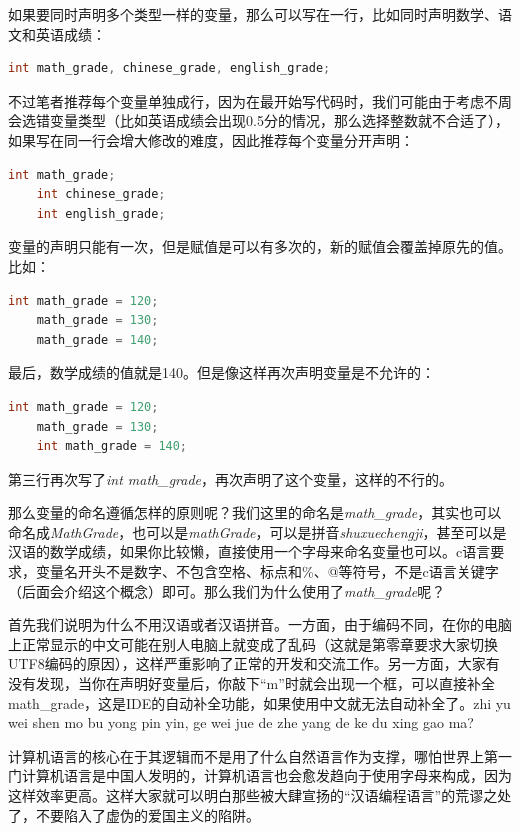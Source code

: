 如果要同时声明多个类型一样的变量，那么可以写在一行，比如同时声明数学、语文和英语成绩：

\begin{lstlisting}[language=C]
    int math_grade, chinese_grade, english_grade;
\end{lstlisting}

不过笔者推荐每个变量单独成行，因为在最开始写代码时，我们可能由于考虑不周会选错变量类型（比如英语成绩会出现0.5分的情况，那么选择整数就不合适了），如果写在同一行会增大修改的难度，因此推荐每个变量分开声明：

\begin{lstlisting}[language=C]
    int math_grade;
    int chinese_grade;
    int english_grade;
\end{lstlisting}

变量的声明只能有一次，但是赋值是可以有多次的，新的赋值会覆盖掉原先的值。比如：

\begin{lstlisting}[language=C]
    int math_grade = 120;
    math_grade = 130; 
    math_grade = 140;
\end{lstlisting}

最后，数学成绩的值就是140。但是像这样再次声明变量是不允许的：

\begin{lstlisting}[language=C]
    int math_grade = 120;
    math_grade = 130; 
    int math_grade = 140;
\end{lstlisting}

第三行再次写了\textit{int math\_grade}，再次声明了这个变量，这样的不行的。

那么变量的命名遵循怎样的原则呢？我们这里的命名是\textit{math\_grade}，其实也可以命名成\textit{MathGrade}，也可以是\textit{mathGrade}，可以是拼音\textit{shuxuechengji}，甚至可以是汉语的数学成绩，如果你比较懒，直接使用一个字母来命名变量也可以。c语言要求，变量名开头不是数字、不包含空格、标点和\%、@等符号，不是c语言关键字（后面会介绍这个概念）即可。那么我们为什么使用了\textit{math\_grade}呢？

首先我们说明为什么不用汉语或者汉语拼音。一方面，由于编码不同，在你的电脑上正常显示的中文可能在别人电脑上就变成了乱码（这就是第零章要求大家切换UTF8编码的原因），这样严重影响了正常的开发和交流工作。另一方面，大家有没有发现，当你在声明好变量后，你敲下“m”时就会出现一个框，可以直接补全math\_grade，这是IDE的自动补全功能，如果使用中文就无法自动补全了。zhi yu wei shen mo bu yong pin yin, ge wei jue de zhe yang de ke du xing gao ma?

计算机语言的核心在于其逻辑而不是用了什么自然语言作为支撑，哪怕世界上第一门计算机语言是中国人发明的，计算机语言也会愈发趋向于使用字母来构成，因为这样效率更高。这样大家就可以明白那些被大肆宣扬的“汉语编程语言”的荒谬之处了，不要陷入了虚伪的爱国主义的陷阱。

